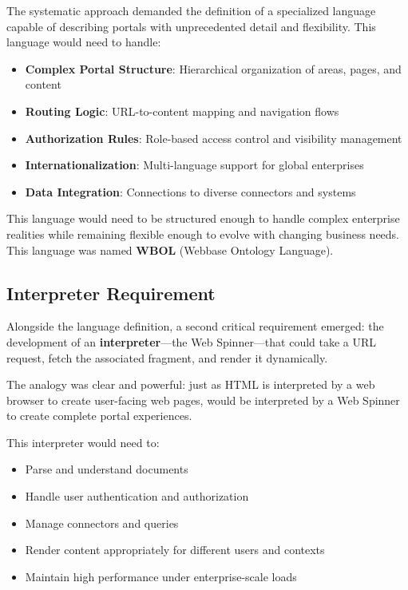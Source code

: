 The systematic approach demanded the definition of a specialized language capable of describing portals with unprecedented detail and flexibility. This language would need to handle:

\begin{itemize}
\item \textbf{Complex Portal Structure}: Hierarchical organization of areas, pages, and content
\item \textbf{Routing Logic}: URL-to-content mapping and navigation flows
\item \textbf{Authorization Rules}: Role-based access control and visibility management
\item \textbf{Internationalization}: Multi-language support for global enterprises
\item \textbf{Data Integration}: Connections to diverse connectors and systems
\end{itemize}

This language would need to be structured enough to handle complex enterprise realities while remaining flexible enough to evolve with changing business needs. This language was named \textbf{WBOL} (Webbase Ontology Language).

\subsection{Interpreter Requirement}

Alongside the language definition, a second critical requirement emerged: the development of an \textbf{interpreter}—the Web Spinner—that could take a URL request, fetch the associated \wbol{} fragment, and render it dynamically.

The analogy was clear and powerful: just as HTML is interpreted by a web browser to create user-facing web pages, \wbol{} would be interpreted by a Web Spinner to create complete portal experiences.

This interpreter would need to:
\begin{itemize}
\item Parse and understand \wbol{} documents
\item Handle user authentication and authorization
\item Manage connectors and queries
\item Render content appropriately for different users and contexts
\item Maintain high performance under enterprise-scale loads
\end{itemize}


